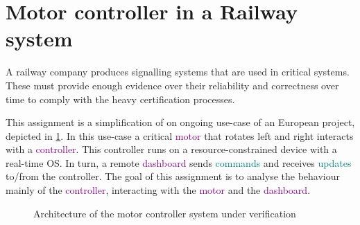 \documentclass[11pt]{article}
\begin{document}
\newcommand{\compn}[1]{\textsf{\textcolor{purple}{#1}}\xspace}
\newcommand{\chn}[1]{\textsf{\textcolor{teal}{#1}}\xspace}

\section*{Motor controller in a Railway system}

A railway company produces signalling systems that are used in critical systems. These must provide enough evidence over their reliability and correctness over time to comply with the heavy certification processes.

This assignment is a simplification of on ongoing use-case of an European project, depicted in \cref{fig:global-architecture}.
In this use-case a critical \compn{motor} that rotates left and right interacts with a \compn{controller}. This controller runs on a resource-constrained device with a real-time OS. In turn, a remote \compn{dashboard} sends \chn{commands} and receives \chn{updates} to/from the controller. The goal of this assignment is to analyse the behaviour mainly of the \compn{controller}, interacting with the \compn{motor} and the \compn{dashboard}.

\begin{figure}[tb]
  \centering
  \caption{Architecture of the motor controller system under verification}
  \label{fig:global-architecture}
\end{figure}
\end{document}

